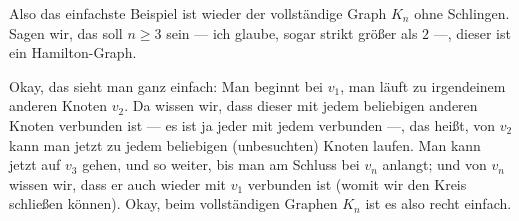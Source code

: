 \begin{spoken-clean}[00:34:16 - 00:35:22]
Also das einfachste Beispiel ist wieder der vollständige Graph $K_n$ ohne Schlingen. Sagen wir, das soll $n \ge 3$ sein --- ich glaube, sogar strikt größer als $2$ ---, dieser ist ein Hamilton-Graph.

Okay, das sieht man ganz einfach: Man beginnt bei $v_1$, man läuft zu irgendeinem anderen Knoten $v_2$. Da wissen wir, dass dieser mit jedem beliebigen anderen Knoten verbunden ist --- es ist ja jeder mit jedem verbunden ---, das heißt, von $v_2$ kann man jetzt zu jedem beliebigen (unbesuchten) Knoten laufen. Man kann jetzt auf $v_3$ gehen, und so weiter, bis man am Schluss bei $v_n$ anlangt; und von $v_n$ wissen wir, dass er auch wieder mit $v_1$ verbunden ist (womit wir den Kreis schließen können). Okay, beim vollständigen Graphen $K_n$ ist es also recht einfach.
\end{spoken-clean}

\begin{math-stroke}
\begin{center}
\end{center}
\end{math-stroke}

